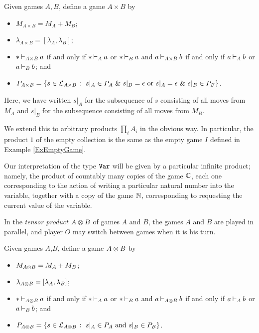 \begin{definition}
  Given games $A,B$, define a game $A\times B$ by
  \begin{itemize}
    \item $M_{A\times B} = M_A + M_B$;
    \item $\lambda_{A\times B} = [\lambda_A,\lambda_B]$;
    \item $* \mathbin{\vdash}_{A\times B} a$ if and only if $*\mathbin{\vdash}_A a$ or $*\mathbin{\vdash}_B a$ and $a \mathbin{\vdash}_{A\times B} b$ if and only if $a \mathbin{\vdash}_A b$ or $a\mathbin{\vdash}_B b$; and
    \item $P_{A\times B} = \{s\in \mathcal L_{A\times B} \;\colon\; \text{$s\vert_A\in P_A$ \& $s\vert_B=\epsilon$ or $s\vert_A=\epsilon$ \& $s\vert_B\in P_B$}\}$.
  \end{itemize}
  Here, we have written $s\vert_A$ for the subsequence of $s$ consisting of all moves from $M_A$ and $s\vert_B$ for the subsequence consisting of all moves from $M_B$.

  We extend this to arbitrary products $\prod_i A_i$ in the obvious way.
  In particular, the product $1$ of the empty collection is the same as the empty game $I$ defined in Example \ref{ExEmptyGame}.
  \label{DefProduct}
\end{definition}

Our interpretation of the type ${\mathtt{Var}}$ will be given by a particular infinite product; namely, the product of countably many copies of the game $\mathbb{C}$, each one corresponding to the action of writing a particular natural number into the variable, together with a copy of the game $\mathbb{N}$, corresponding to requesting the current value of the variable.

In the \emph{tensor product} $A\otimes B$ of games $A$ and $B$, the games $A$ and $B$ are played in parallel, and player $O$ may switch between games when it is his turn.

\begin{definition}
  Given games $A$,$B$, define a game $A\otimes B$ by
  \begin{itemize}
    \item $M_{A\otimes B} = M_A + M_B$;
    \item $\lambda_{A\otimes B} = [\lambda_A,\lambda_B]$;
    \item $* \mathbin{\vdash}_{A\otimes B} a$ if and only if $*\mathbin{\vdash}_A a$ or $*\mathbin{\vdash}_B a$ and $a \mathbin{\vdash}_{A\otimes B} b$ if and only if $a \mathbin{\vdash}_A b$ or $a\mathbin{\vdash}_B b$; and
    \item $P_{A\otimes B} = \{s\in \mathcal L_{A\otimes B} \;\colon\; \text{$s\vert_A\in P_A$ and $s\vert_B\in P_B$}\}$.
  \end{itemize}
\end{definition}

